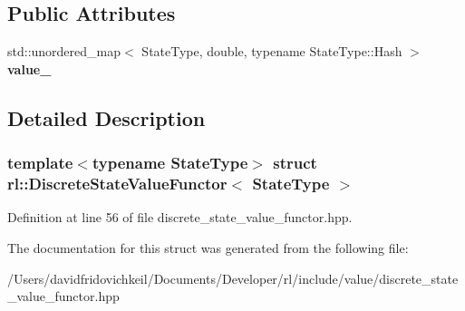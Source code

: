 \subsection*{Public Attributes}
\begin{DoxyCompactItemize}
\item 
\hypertarget{structrl_1_1_discrete_state_value_functor_a3467f778e304e14ddc44d271d41e0b6f}{}\label{structrl_1_1_discrete_state_value_functor_a3467f778e304e14ddc44d271d41e0b6f} 
std\+::unordered\+\_\+map$<$ State\+Type, double, typename State\+Type\+::\+Hash $>$ {\bfseries value\+\_\+}
\end{DoxyCompactItemize}


\subsection{Detailed Description}
\subsubsection*{template$<$typename State\+Type$>$\newline
struct rl\+::\+Discrete\+State\+Value\+Functor$<$ State\+Type $>$}



Definition at line 56 of file discrete\+\_\+state\+\_\+value\+\_\+functor.\+hpp.



The documentation for this struct was generated from the following file\+:\begin{DoxyCompactItemize}
\item 
/\+Users/davidfridovichkeil/\+Documents/\+Developer/rl/include/value/discrete\+\_\+state\+\_\+value\+\_\+functor.\+hpp\end{DoxyCompactItemize}
